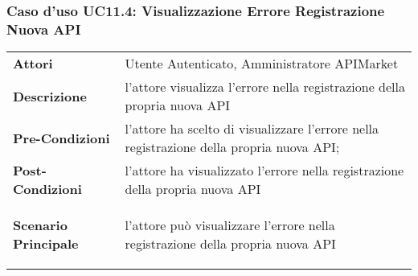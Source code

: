 \subsubsection{Caso d'uso UC11.4: Visualizzazione Errore Registrazione Nuova API}
\label{UC11.4}

\renewcommand*{\arraystretch}{1.6}
\begin{longtable}{ l | p{11cm}}
	\hline
	\rowcolor{Gray}
	\multicolumn{2}{c}{UC11.4: Visualizzazione Errore Registrazione Nuova API} \\
	\hline
	\textbf{Attori} &Utente Autenticato, Amministratore APIMarket \\
	\textbf{Descrizione} &  l'attore visualizza l'errore nella registrazione della propria nuova API \\
	\textbf{Pre-Condizioni} & l'attore ha scelto di visualizzare l'errore nella registrazione della propria nuova API;\\
	\textbf{Post-Condizioni}&l'attore ha visualizzato l'errore nella registrazione della propria nuova API\\
	\textbf{Scenario Principale} & \begin{enumerate*}[label=(\arabic*.),itemjoin={\newline}]
		\item l'attore può visualizzare l'errore nella registrazione della propria nuova API
	\end{enumerate*}\\
\end{longtable}
